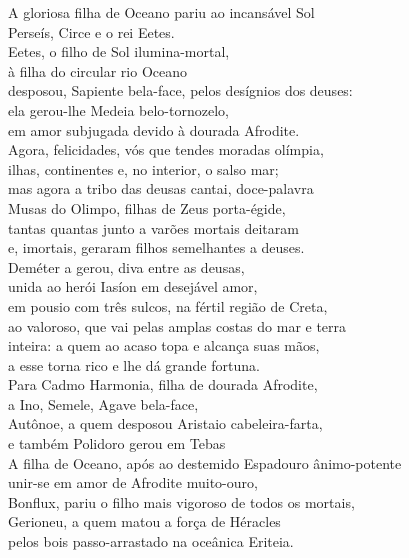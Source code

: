 \begin{pages}
\begin{Rightside}
\quad{}A gloriosa filha de Oceano pariu ao incansável Sol\\
Perseís, Circe e o rei Eetes.\\
Eetes, o filho de Sol ilumina-mortal,\\
à filha do circular rio Oceano\\
desposou, Sapiente bela-face, pelos desígnios dos deuses: \\
ela gerou-lhe Medeia belo-tornozelo,\\
em amor subjugada devido à dourada Afrodite.\\

\Para
Agora, felicidades, vós que tendes moradas olímpia,\\
ilhas, continentes e, no interior, o salso mar;\\
mas agora a tribo das deusas cantai, doce-palavra \\
Musas do Olimpo, filhas de Zeus porta-égide,\\
tantas quantas junto a varões mortais deitaram\\
e, imortais, geraram filhos semelhantes a deuses.\\

\quad{}Deméter a  gerou, diva entre as deusas,\\
unida ao herói Iasíon em desejável amor, \\
em pousio com três sulcos, na fértil região de Creta,\\
ao valoroso, que vai pelas amplas costas do mar e terra\\
inteira: a quem ao acaso topa e alcança suas mãos,\\
a esse torna rico e lhe dá grande fortuna.\\

\quad{}Para Cadmo Harmonia, filha de dourada Afrodite, \\
a Ino, Semele, Agave bela-face,\\
Autônoe, a quem desposou Aristaio cabeleira-farta,\\
e também Polidoro gerou em Tebas \\

\quad{}A filha de Oceano, após ao destemido Espadouro \qb{}ânimo-potente\\
unir-se em amor de Afrodite muito-ouro, \\
Bonflux, pariu o filho mais vigoroso de todos os mortais,\\
Gerioneu, a quem matou a força de Héracles\\
pelos bois passo-arrastado na oceânica Eriteia.\\


\end{Rightside}
\end{pages}
